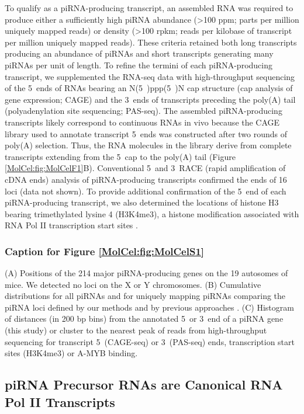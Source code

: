     To qualify as a piRNA-producing transcript, an assembled RNA was required to produce either a sufficiently high piRNA abundance (>100 ppm; parts per million uniquely mapped reads) or density (>100 rpkm; reads per kilobase of transcript per million uniquely mapped reads). These criteria retained both long transcripts producing an abundance of piRNAs and short transcripts generating many piRNAs per unit of length. To refine the termini of each piRNA-producing transcript, we supplemented the RNA-seq data with high-throughput sequencing of the 5\textprime~ends of RNAs bearing an N(5\textprime~)ppp(5\textprime~)N cap structure (cap analysis of gene expression; CAGE) and the 3\textprime~ends of transcripts preceding the poly(A) tail (polyadenylation site sequencing; PAS-seq). The assembled piRNA-producing transcripts likely correspond to continuous RNAs in vivo because the CAGE library used to annotate transcript 5\textprime~ends was constructed after two rounds of poly(A) selection. Thus, the RNA molecules in the library derive from complete transcripts extending from the 5\textprime~cap to the poly(A) tail (Figure \ref{MolCel:fig:MolCelF1}B). Conventional 5\textprime~and 3\textprime~RACE (rapid amplification of cDNA ends) analysis of piRNA-producing transcripts confirmed the ends of 16 loci (data not shown). To provide additional confirmation of the 5\textprime~end of each piRNA-producing transcript, we also determined the locations of histone H3 bearing trimethylated lysine 4 (H3K4me3), a histone modification associated with RNA Pol II transcription start sites \cite{Guenther2007}.

    \subsubsection{Caption for Figure \ref{MolCel:fig:MolCelS1}}
      \label{MolCel:subsubsec:cap:Figure S1}
      (A) Positions of the 214 major piRNA-producing genes on the 19 autosomes of mice. We detected no loci on the X or Y chromosomes. (B) Cumulative distributions for all piRNAs and for uniquely mapping piRNAs comparing the piRNA loci defined by our methods and by previous approaches \citep{Girard2006, Lau2006}. (C) Histogram of distances (in 200 bp bins) from the annotated 5\textprime~or 3\textprime~end of a piRNA gene (this study) or cluster to the nearest peak of reads from high-throughput sequencing for transcript 5\textprime~(CAGE-seq) or 3\textprime~(PAS-seq) ends, transcription start sites (H3K4me3) or A-MYB binding.

  \subsection{piRNA Precursor RNAs are Canonical RNA Pol II Transcripts}
    \label{MolCel:subsec:Precursors are Pol II Txs}

